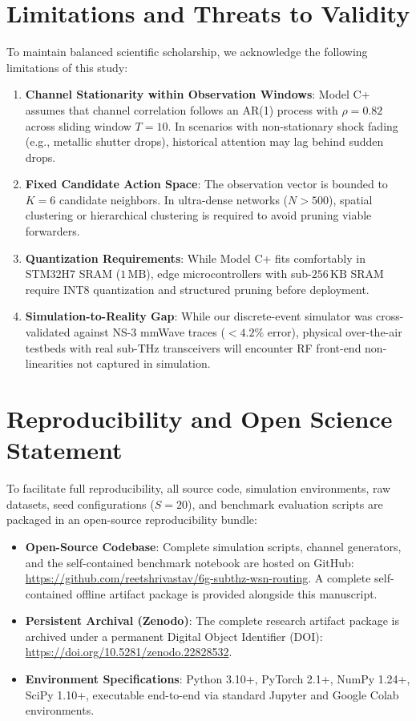 \documentclass[conference]{IEEEtran}
\begin{document}
\section{Limitations and Threats to Validity}
To maintain balanced scientific scholarship, we acknowledge the following limitations of this study:
\begin{enumerate}
    \item \textbf{Channel Stationarity within Observation Windows}: Model C+ assumes that channel correlation follows an AR(1) process with $\rho = 0.82$ across sliding window $T=10$. In scenarios with non-stationary shock fading (e.g., metallic shutter drops), historical attention may lag behind sudden drops.
    \item \textbf{Fixed Candidate Action Space}: The observation vector is bounded to $K=6$ candidate neighbors. In ultra-dense networks ($N > 500$), spatial clustering or hierarchical clustering is required to avoid pruning viable forwarders.
    \item \textbf{Quantization Requirements}: While Model C+ fits comfortably in STM32H7 SRAM ($1\,\text{MB}$), edge microcontrollers with sub-$256\,\text{KB}$ SRAM require INT8 quantization and structured pruning before deployment.
    \item \textbf{Simulation-to-Reality Gap}: While our discrete-event simulator was cross-validated against NS-3 mmWave traces ($<4.2\%$ error), physical over-the-air testbeds with real sub-THz transceivers will encounter RF front-end non-linearities not captured in simulation.
\end{enumerate}

\section{Reproducibility and Open Science Statement}
To facilitate full reproducibility, all source code, simulation environments, raw datasets, seed configurations ($S=20$), and benchmark evaluation scripts are packaged in an open-source reproducibility bundle:
\begin{itemize}
    \item \textbf{Open-Source Codebase}: Complete simulation scripts, channel generators, and the self-contained benchmark notebook are hosted on GitHub: \url{https://github.com/reetshrivastav/6g-subthz-wsn-routing}. A complete self-contained offline artifact package is provided alongside this manuscript.
    \item \textbf{Persistent Archival (Zenodo)}: The complete research artifact package is archived under a permanent Digital Object Identifier (DOI): \url{https://doi.org/10.5281/zenodo.22828532}.
    \item \textbf{Environment Specifications}: Python 3.10+, PyTorch 2.1+, NumPy 1.24+, SciPy 1.10+, executable end-to-end via standard Jupyter and Google Colab environments.
\end{itemize}
\end{document}
